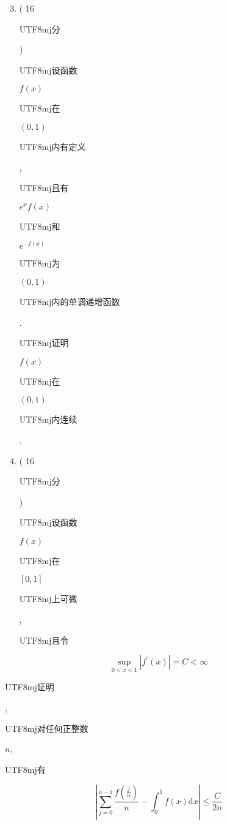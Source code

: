 \documentclass[10pt]{article}
\begin{document}
\begin{enumerate}
  \setcounter{enumi}{2}
  \item ( 16 \begin{CJK}{UTF8}{mj}分\end{CJK}) \begin{CJK}{UTF8}{mj}设函数\end{CJK} $f(x)$ \begin{CJK}{UTF8}{mj}在\end{CJK} $(0,1)$ \begin{CJK}{UTF8}{mj}内有定义\end{CJK}, \begin{CJK}{UTF8}{mj}且有\end{CJK} $e^{x} f(x)$ \begin{CJK}{UTF8}{mj}和\end{CJK} $e^{-f(x)}$ \begin{CJK}{UTF8}{mj}为\end{CJK} $(0,1)$ \begin{CJK}{UTF8}{mj}内的单调递增函数\end{CJK}. \begin{CJK}{UTF8}{mj}证明\end{CJK} $f(x)$ \begin{CJK}{UTF8}{mj}在\end{CJK} $(0,1)$ \begin{CJK}{UTF8}{mj}内连续\end{CJK}.

  \item ( 16 \begin{CJK}{UTF8}{mj}分\end{CJK}) \begin{CJK}{UTF8}{mj}设函数\end{CJK} $f(x)$ \begin{CJK}{UTF8}{mj}在\end{CJK} $[0,1]$ \begin{CJK}{UTF8}{mj}上可微\end{CJK}, \begin{CJK}{UTF8}{mj}且令\end{CJK}

\end{enumerate}
$$
\sup _{0<x<1}\left|f^{\prime}(x)\right|=C<\infty
$$
\begin{CJK}{UTF8}{mj}证明\end{CJK}, \begin{CJK}{UTF8}{mj}对任何正整数\end{CJK} $n$, \begin{CJK}{UTF8}{mj}有\end{CJK}
$$
\left|\sum_{j=0}^{n-1} \frac{f\left(\frac{j}{n}\right)}{n}-\int_{0}^{1} f(x) \mathrm{d} x\right| \leqslant \frac{C}{2 n}
$$
\end{document}
